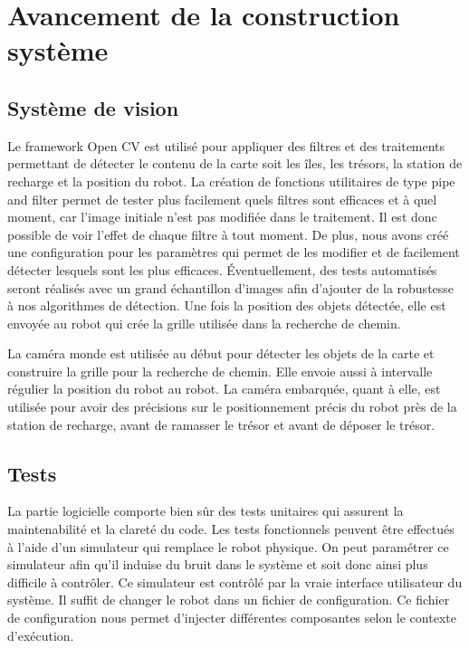 \chapter{Avancement de la construction système}

\section{Système de vision}

Le framework Open CV est utilisé pour appliquer des filtres et des traitements permettant de détecter le contenu de la carte soit
les îles, les trésors, la station de recharge et la position du robot. La création de fonctions utilitaires de type pipe and filter
permet de tester plus facilement quels filtres sont efficaces et à quel moment, car l'image initiale n'est pas modifiée dans le
traitement. Il est donc possible de voir l'effet de chaque filtre à tout moment. De plus, nous avons créé une configuration
pour les paramètres qui permet de les modifier et de facilement détecter lesquels sont les plus efficaces. Éventuellement, des
tests automatisés seront réalisés avec un grand échantillon d'images afin d'ajouter de la robustesse à nos algorithmes de détection.
Une fois la position des objets détectée, elle est envoyée au robot qui crée la grille utilisée dans la recherche de chemin.


La caméra monde est utilisée au début pour détecter les objets de la carte et construire la grille pour la recherche de chemin. Elle envoie aussi à intervalle régulier la position du robot au robot. La caméra embarquée, quant à elle, est utilisée pour avoir des précisions sur le positionnement précis du robot près de la station de recharge, avant de ramasser le trésor et avant de déposer le trésor.

\section{Tests}
La partie logicielle comporte bien sûr des tests unitaires qui assurent la maintenabilité et la clareté du code.
Les tests fonctionnels peuvent être effectués à l'aide d'un simulateur qui remplace le robot physique.
On peut paramétrer ce simulateur afin qu'il induise du bruit dans le système et soit donc ainsi plus difficile à contrôler.
Ce simulateur est contrôlé par la vraie interface utilisateur du système.
Il suffit de changer le robot dans un fichier de configuration.
Ce fichier de configuration nous permet d'injecter différentes composantes selon le contexte d'exécution.

